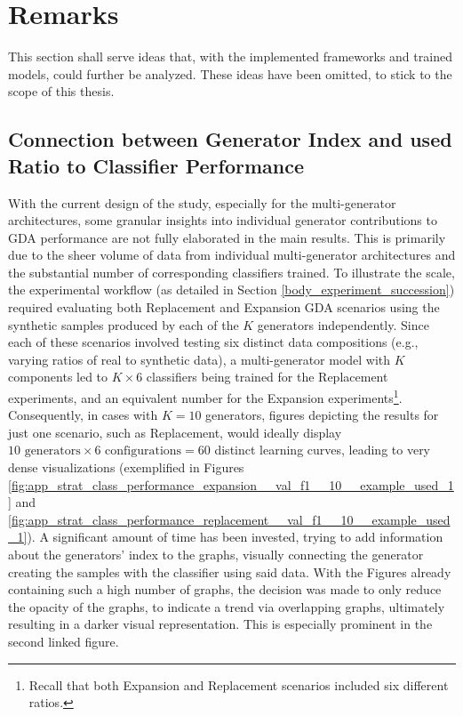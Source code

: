 \section{Remarks} \label{chapter_remarks}
This section shall serve ideas that, with the implemented frameworks and trained models, could further be analyzed. These ideas have been omitted, to stick to the scope of this thesis.

\subsection{Connection between Generator Index and used Ratio to Classifier Performance}
\noindent \noindent With the current design of the study, especially for the multi-generator architectures, some granular insights into individual generator contributions to GDA performance are not fully elaborated in the main results. This is primarily due to the sheer volume of data from individual multi-generator architectures and the substantial number of corresponding classifiers trained. To illustrate the scale, the experimental workflow (as detailed in Section \ref{body_experiment_succession}) required evaluating both Replacement and Expansion GDA scenarios using the synthetic samples produced by each of the $K$ generators independently. Since each of these scenarios involved testing six distinct data compositions (e.g., varying ratios of real to synthetic data), a multi-generator model with $K$ components led to $K \times 6$ classifiers being trained for the Replacement experiments, and an equivalent number for the Expansion experiments\footnote{Recall that both Expansion and Replacement scenarios included six different ratios.}. Consequently, in cases with $K=10$ generators, figures depicting the results for just one scenario, such as Replacement, would ideally display $10 \text{ generators} \times 6 \text{ configurations} = 60$ distinct learning curves, leading to very dense visualizations (exemplified in Figures \ref{fig:app_strat_class_performance_expansion__val_f1__10__example_used_1} and \ref{fig:app_strat_class_performance_replacement__val_f1__10__example_used_1}). A significant amount of time has been invested, trying to add information about the generators' index to the graphs, visually connecting the generator creating the samples with the classifier using said data. With the Figures already containing such a high number of graphs, the decision was made to only reduce the opacity of the graphs, to indicate a trend via overlapping graphs, ultimately resulting in a darker visual representation. This is especially prominent in the second linked figure.

